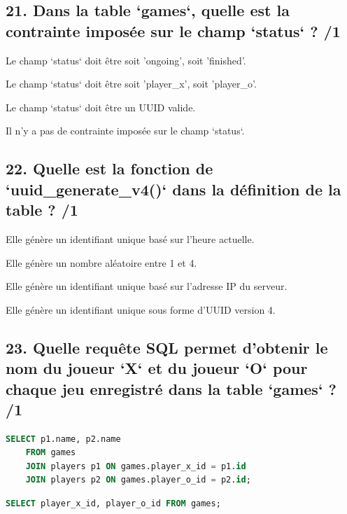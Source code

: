 \documentclass[12pt,a4paper]{article}
\begin{document}
\begin{flushleft}
\subsection*{21. Dans la table `games`, quelle est la contrainte imposée sur le champ `status` ? /1}
\begin{choices}
    \item Le champ `status` doit être soit 'ongoing', soit 'finished'.
    \item Le champ `status` doit être soit 'player\_x', soit 'player\_o'.
    \item Le champ `status` doit être un UUID valide.
    \item Il n'y a pas de contrainte imposée sur le champ `status`.
\end{choices}

\subsection*{22. Quelle est la fonction de `uuid\_generate\_v4()` dans la définition de la table ? /1}
\begin{choices}
    \item Elle génère un identifiant unique basé sur l'heure actuelle.
    \item Elle génère un nombre aléatoire entre 1 et 4.
    \item Elle génère un identifiant unique basé sur l'adresse IP du serveur.
    \item Elle génère un identifiant unique sous forme d'UUID version 4.
\end{choices}

\newpage

\subsection*{23. Quelle requête SQL permet d'obtenir le nom du joueur `X` et du joueur `O` pour chaque jeu enregistré dans la table `games` ? /1}
\begin{choices}
    \item \hspace{1cm}
    \begin{lstlisting}[language=SQL]
    SELECT p1.name, p2.name
    FROM games
    JOIN players p1 ON games.player_x_id = p1.id
    JOIN players p2 ON games.player_o_id = p2.id;
    \end{lstlisting}

    \item \hspace{1cm}
    \begin{lstlisting}[language=SQL]
    SELECT player_x_id, player_o_id FROM games;
    \end{lstlisting}


\end{choices}
\end{flushleft}
\end{document}
